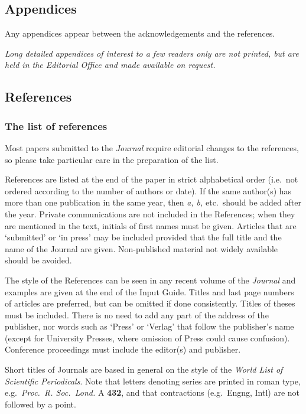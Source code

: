 \subsection{Appendices}
Any appendices appear between the acknowledgements and the references.

{\em Long detailed appendices of interest to a few readers only are not
printed, but are held in the Editorial Office and made available on request.}

\subsection{References}

\subsubsection{The list of references}
Most papers submitted to the {\em Journal\/} require editorial changes to the
references, so please take particular care in the preparation of the list.

References are listed at the end of the paper in strict alphabetical
order (i.e.\ not ordered according to the number of authors or date). If the
same author(s) has more than one publication in the same year, then {\it a,
b,} etc.\ should be added after the year.  Private communications are not
included in the References; when they are mentioned in the text, initials of
first names must be given. Articles that are `submitted' or `in press' may be
included provided that the full title and the name of the Journal are given. 
Non-published material not widely available should be avoided.

The style of the References can be seen in any recent volume of the
{\em Journal} and examples are given at the end of the Input Guide. Titles
and last page numbers of articles are preferred, but can be omitted  if
done consistently. Titles of theses must be included. There is no need to
add any part of the address of the publisher, nor words such as `Press' or
`Verlag' that follow the publisher's name (except for University Presses,
where omission of Press could cause confusion). Conference proceedings must
include the editor(s) and publisher.

Short titles of Journals are based in general on the style of the {\em World
List of Scientific Periodicals}. Note that letters denoting series are
printed in roman type, e.g.\ {\em Proc.\ R. Soc.\ Lond.} A {\bf 432}, and
that contractions (e.g.\ Engng, Intl) are not followed by a point.

